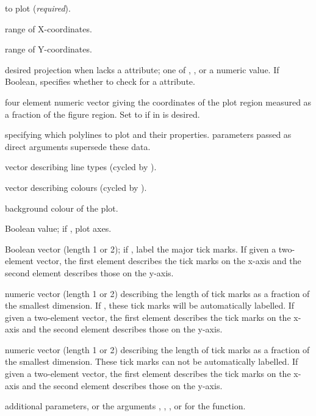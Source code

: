\documentclass[letterpaper]{book}
\begin{document}
%
\begin{Arguments}
\begin{ldescription}
\item[\code{polys}]  to plot (\emph{required}).
\item[\code{xlim}] range of X-coordinates.
\item[\code{ylim}] range of Y-coordinates.
\item[\code{projection}] desired projection when  lacks a
 attribute; one of , ,
or a numeric value.  If Boolean, specifies whether to check
 for a  attribute.
\item[\code{plt}] four element numeric vector  giving
the coordinates of the plot region measured as a fraction of the
figure region. Set to  if  in  is
desired.
\item[\code{polyProps}]  specifying which polylines to plot and their
properties.   parameters passed as direct arguments
supersede these data.
\item[\code{lty}] vector describing line types (cycled by ).
\item[\code{col}] vector describing colours (cycled by ).
\item[\code{bg}] background colour of the plot.
\item[\code{axes}] Boolean value; if , plot axes.
\item[\code{tckLab}] Boolean vector (length 1 or 2); if , 
label the major tick marks.  If given a two-element
vector, the first element describes the tick marks on the
x-axis and the second element describes those on the y-axis.
\item[\code{tck}] numeric vector (length 1 or 2) describing the length
of tick marks as a fraction of the smallest dimension. If
, these tick marks will be automatically
labelled.  If given a two-element vector, the first element
describes the tick marks on the x-axis and the second element
describes those on the y-axis.
\item[\code{tckMinor}] numeric vector (length 1 or 2) describing the length
of tick marks as a fraction of the smallest dimension.  These tick
marks can not be automatically labelled.  If given a two-element vector,
the first element describes the tick marks on the x-axis and
the second element describes those on the y-axis.
\item[\code{...}] additional  parameters, or the arguments
, , , or  for the
 function.
\end{ldescription}
\end{Arguments}
\end{document}
